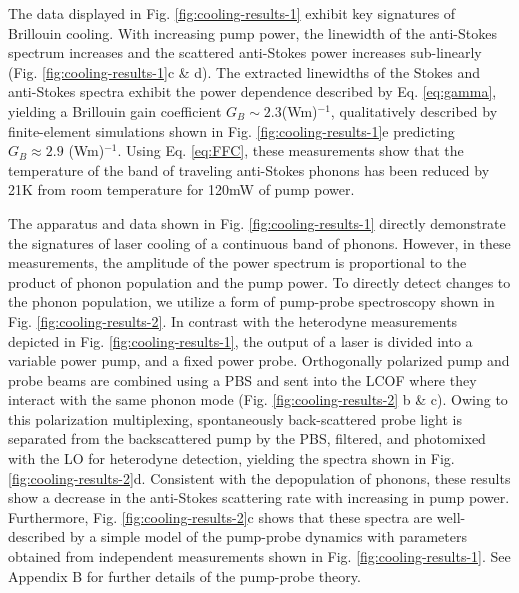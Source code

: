The data displayed in Fig. \ref{fig:cooling-results-1} exhibit key signatures of Brillouin cooling. With increasing pump power, the linewidth of the anti-Stokes spectrum increases and the scattered anti-Stokes power increases sub-linearly (Fig. \ref{fig:cooling-results-1}c \& d). The extracted linewidths of the Stokes and anti-Stokes spectra exhibit the power dependence described by Eq. \eqref{eq:gamma}, yielding a Brillouin gain coefficient $G_B \sim 2.3$(Wm)$^{-1}$, qualitatively described by finite-element simulations shown in Fig. \ref{fig:cooling-results-1}e predicting $G_B \approx 2.9$ (Wm)$^{-1}$. %
Using Eq. \eqref{eq:FFC}, these measurements show that the temperature of the band of traveling anti-Stokes phonons has been reduced by 21K from room temperature for 120mW of pump power.

The apparatus and data shown in Fig. \ref{fig:cooling-results-1} directly demonstrate the signatures of laser cooling of a continuous band of phonons. However, in these measurements, the amplitude of the power spectrum is proportional to the product of phonon population and the pump power. To directly detect changes to the phonon population, we utilize a form of pump-probe spectroscopy shown in Fig. \ref{fig:cooling-results-2}. In contrast with the heterodyne measurements depicted in Fig. \ref{fig:cooling-results-1}, the output of a laser is divided into a variable power pump, and a fixed power probe. Orthogonally polarized pump and probe beams are combined using a \acf{PBS} and sent into the \ac{LCOF} where they interact with the same phonon mode (Fig. \ref{fig:cooling-results-2} b \& c). Owing to this polarization multiplexing, spontaneously back-scattered probe light is separated from the backscattered pump by the \ac{PBS}, filtered, and photomixed with the \ac{LO} for heterodyne detection, yielding the spectra shown in Fig. \ref{fig:cooling-results-2}d. Consistent with the depopulation of phonons, these results show a decrease in the anti-Stokes scattering rate with increasing in pump power. Furthermore, Fig. \ref{fig:cooling-results-2}c shows that these spectra are well-described by a simple model of the pump-probe dynamics with parameters obtained from independent measurements shown in Fig. \ref{fig:cooling-results-1}. See Appendix B for further details of the pump-probe theory.

